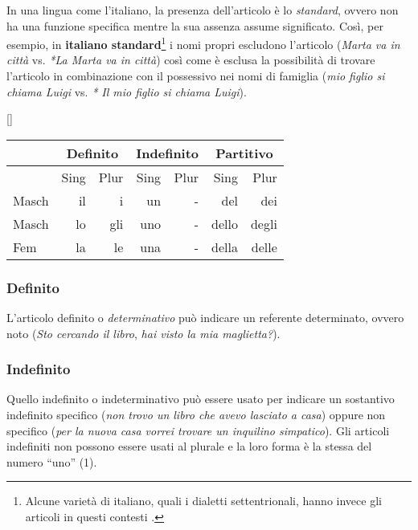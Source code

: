 \documentclass[a4paper,twoside,11pt,chapterprefix=false,bibliography=totocnumbered,listof=flat]{scrbook}
\makeatletter
\renewenvironment{table}[1][\fps@table]{
  \edef\@tempa{\noexpand\@float{table}[#1]} 
  \@tempa
  \sffamily
  \footnotesize
}{
  \end@float
}
\makeatother
\begin{document}
In una lingua come l'italiano, la presenza dell'articolo è lo
\emph{standard}, ovvero non ha una funzione specifica mentre la sua
assenza assume significato. Così, per esempio, in \textbf{italiano
standard}\footnote{Alcune varietà di italiano, quali i dialetti
  settentrionali, hanno invece gli articoli in questi contesti
  \citep{loporcaro2009}.} i nomi propri escludono l'articolo
(\emph{Marta va in città} vs. \emph{*La Marta va in città}) così come è
esclusa la possibilità di trovare l'articolo in combinazione con il
possessivo nei nomi di famiglia (\emph{mio figlio si chiama Luigi} vs.
\emph{* Il mio figlio si chiama Luigi}).

\begin{table}[]
\begin{tabular}{@{}lrrrrrr@{}}
\toprule
      & \multicolumn{2}{c}{Definito} & \multicolumn{2}{c}{Indefinito} & \multicolumn{2}{c}{Partitivo} \\ \midrule
      & Sing          & Plur         & Sing           & Plur          & Sing          & Plur          \\
Masch & il            & i            & un             & -             & del           & dei           \\
Masch & lo            & gli          & uno            & -             & dello         & degli         \\
Fem   & la            & le           & una            & -             & della         & delle         \\ \bottomrule
\end{tabular}
\caption{Tabella riassuntiva degli articoli in italiano}
\end{table}

\subsubsection{Definito}\label{definito}

L'articolo definito o \emph{determinativo} può indicare un referente
determinato, ovvero noto (\emph{Sto cercando il libro}, \emph{hai visto
la mia maglietta?}).

\subsubsection{Indefinito}\label{indefinito}

Quello indefinito o indeterminativo può essere usato per indicare un
sostantivo indefinito specifico (\emph{non trovo un libro che avevo
lasciato a casa}) oppure non specifico (\emph{per la nuova casa vorrei
trovare un inquilino simpatico}). Gli articoli indefiniti non possono
essere usati al plurale e la loro forma è la stessa del numero
\enquote{uno} (1).
\end{document}
